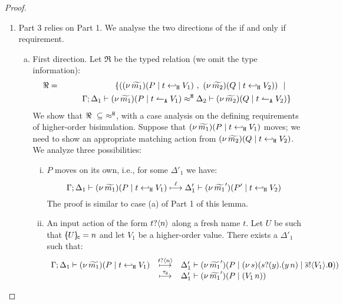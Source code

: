 \begin{proof}
\begin{enumerate}[$-$]
	\item Part 3 relies on Part 1. We analyse the two	directions of the if and only if requirement.
	\begin{enumerate}[(a)]
		\item First direction. Let $\Re$ be the typed relation (we omit the type information):
				\begin{eqnarray*}
					\Re &=&	\set{	(\newsp{\widetilde{m_1}}{P \Par \htrigger{t}{V_1}}\ ,\ 
									\newsp{\widetilde{m_2}}{Q \Par \htrigger{t}{V_2}}) \setbar\\
						&&
									\qquad \horel{\Gamma}{\Delta_1}{\newsp{\widetilde{m_1}}{P \Par \ntrigger{t}{V_1}  } }
									{\hwb}
									{\Delta_2}{\newsp{\widetilde{m_2}}{Q \Par \ntrigger{t}{V_2}  } }
					}
				\end{eqnarray*}
				We show that $\Re\ \subseteq\ \hwb$, with a case analysis on the defining requirements
				of higher-order bisimulation. Suppose that $(\nu\, \widetilde{m_1})(P \;|\; t \hookleftarrow_{\mathtt{H}} V_1)$ moves;
				we need to show an appropriate matching action from $(\nu\, \widetilde{m_2})(Q \;|\; t \hookleftarrow_{\mathtt{H}} V_2)$.
				We analyze three possibilities:
				\begin{enumerate}[i)]
					\item $P$ moves on its own, i.e., for some $\Delta'_1$ we have:
							\[
								\Gamma; \Delta_1 \vdash (\nu\, \widetilde{m_1})(P \;|\; t \hookleftarrow_{\mathtt{H}} V_1  )  \stackrel{\ell}{\longmapsto} \Delta_1' \vdash (\nu\, \widetilde{m_1}')(P' \;|\; t \hookleftarrow_{\mathtt{H}} V_2  )
							\]
							The proof is similar to case (a) of Part 1 of this lemma.
					\item	An input action of the form $t ? \langle n \rangle$ along a fresh name $t$.
							Let $U$ be such that $[\!\!(U)\!\!]_{\mathsf{c}} = n$ and let $V_1$ be a higher-order value.  
							There exists a $\Delta'_1$ such that:
							$$
							\begin{array}{rcl}
							\Gamma; \Delta_1 \vdash (\nu\, \widetilde{m_1})(P \;|\; t \hookleftarrow_{\mathtt{H}} V_1  ) & \stackrel{t ? \langle n \rangle}{\longmapsto}& 
							\Delta_1' \vdash (\nu\, \widetilde{m_1}')(P \;|\; (\nu\, s)(s ? (y) . (y\, {n}) \;|\; \overline{s} ! \langle V_1 \rangle . \mathbf{0})) \\
							& \stackrel{\tau_{\mathsf{d}}}{\longmapsto} & 
								\Delta_1' \vdash (\nu\, \widetilde{m_1}')(P \;|\; (V_1\, {n}))
							\end{array}
$$
\end{enumerate}
\end{enumerate}
\end{enumerate}
\end{proof}
